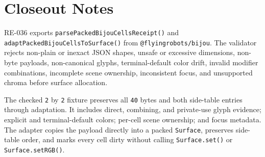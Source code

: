 \section{Closeout Notes}\label{record-164-closeout-notes}

RE-036 exports \texttt{p\allowbreak{}a\allowbreak{}r\allowbreak{}s\allowbreak{}e\allowbreak{}P\allowbreak{}a\allowbreak{}c\allowbreak{}k\allowbreak{}e\allowbreak{}d\allowbreak{}B\allowbreak{}i\allowbreak{}j\allowbreak{}o\allowbreak{}u\allowbreak{}C\allowbreak{}e\allowbreak{}l\allowbreak{}l\allowbreak{}s\allowbreak{}R\allowbreak{}e\allowbreak{}c\allowbreak{}e\allowbreak{}i\allowbreak{}p\allowbreak{}t\allowbreak{}(\allowbreak{})} and \texttt{a\allowbreak{}d\allowbreak{}a\allowbreak{}p\allowbreak{}t\allowbreak{}P\allowbreak{}a\allowbreak{}c\allowbreak{}k\allowbreak{}e\allowbreak{}d\allowbreak{}B\allowbreak{}i\allowbreak{}j\allowbreak{}o\allowbreak{}u\allowbreak{}C\allowbreak{}e\allowbreak{}l\allowbreak{}l\allowbreak{}s\allowbreak{}T\allowbreak{}o\allowbreak{}S\allowbreak{}u\allowbreak{}r\allowbreak{}f\allowbreak{}a\allowbreak{}c\allowbreak{}e\allowbreak{}(\allowbreak{})} from \texttt{@\allowbreak{}f\allowbreak{}l\allowbreak{}y\allowbreak{}i\allowbreak{}n\allowbreak{}g\allowbreak{}r\allowbreak{}o\allowbreak{}b\allowbreak{}o\allowbreak{}t\allowbreak{}s\allowbreak{}/\allowbreak{}b\allowbreak{}i\allowbreak{}j\allowbreak{}o\allowbreak{}u}. The validator rejects non-plain or inexact JSON shapes, unsafe or excessive dimensions, non-byte payloads, non-canonical glyphs, terminal-default color drift, invalid modifier combinations, incomplete scene ownership, inconsistent focus, and unsupported chroma before surface allocation.

The checked \texttt{2} by \texttt{2} fixture preserves all \texttt{4\allowbreak{}0} bytes and both side-table entries through adaptation. It includes direct, combining, and private-use glyph evidence; explicit and terminal-default colors; per-cell scene ownership; and focus metadata. The adapter copies the payload directly into a packed \texttt{S\allowbreak{}u\allowbreak{}r\allowbreak{}f\allowbreak{}a\allowbreak{}c\allowbreak{}e}, preserves side-table order, and marks every cell dirty without calling \texttt{S\allowbreak{}u\allowbreak{}r\allowbreak{}f\allowbreak{}a\allowbreak{}c\allowbreak{}e\allowbreak{}.\allowbreak{}s\allowbreak{}e\allowbreak{}t\allowbreak{}(\allowbreak{})} or \texttt{S\allowbreak{}u\allowbreak{}r\allowbreak{}f\allowbreak{}a\allowbreak{}c\allowbreak{}e\allowbreak{}.\allowbreak{}s\allowbreak{}e\allowbreak{}t\allowbreak{}R\allowbreak{}G\allowbreak{}B\allowbreak{}(\allowbreak{})}.

